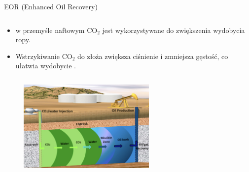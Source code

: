 \begin{columnframe}{EOR (Enhanced Oil Recovery)}
    \begin{column}{0.5\textwidth}
        \begin{itemize}
            \item w przemyśle naftowym CO$_2$ jest wykorzystywane do zwiększenia wydobycia ropy.
            \item Wstrzykiwanie CO$_2$ do złoża zwiększa ciśnienie i zmniejsza gęstość, co ułatwia wydobycie .
        \end{itemize}
    \end{column}
    \begin{column}{0.5\textwidth}
        \begin{figure}
            \centering
            \includegraphics[width=0.6\textwidth, frame]{images/enhanced_oil_recovery.png}
        \end{figure}
    \end{column}
\end{columnframe}

